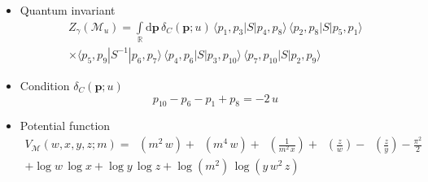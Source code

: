 \documentclass[12pt,reqno]{amsart}
\numberwithin{equation}{section}
\DeclareMathOperator{\Li}{Li_2}
\begin{document}
\begin{itemize}
\item Quantum invariant
  \begin{multline*}
    Z_\gamma \left( \mathcal{M}_u \right)
    = \int\limits_\mathbb{R} 
 \mathrm{d} \boldsymbol{p} \,
  \delta_C(\boldsymbol{p}; u) \,
    \langle p_1 , p_3 | S | p_4 , p_8 \rangle \,
    \langle p_2 , p_8 | S | p_5 , p_1 \rangle 
    \\
    \times
    \langle p_5 , p_9 | S^{-1} | p_6 , p_7 \rangle \,
    \langle p_4 , p_6 | S | p_3 , p_{10} \rangle \,
    \langle p_7 , p_{10} | S | p_2 , p_9 \rangle 
  \end{multline*}

\item
Condition $\delta_C(\boldsymbol{p};u)$
  \begin{equation*}
    p_{10} - p_6 - p_1 + p_8
    = -  2 \, u
  \end{equation*}

\item Potential function
  \begin{multline*}
    V_{\mathcal{M}}(w,x,y,z; m)
    =
    \Li \left(m^2 \, w\right) + \Li(m^4 \, w)
    + \Li\left(\frac{1}{m^2 \, x}\right)
    + \Li\left(\frac{z}{w}\right)
    - \Li\left(\frac{z}{y}\right) - \frac{\pi^2}{2}
    \\
    + \log w \, \log x + \log y \, \log z
    + \log \left( m^2 \right) \, \log (y \, w^2 \, z)
  \end{multline*}



\end{itemize}
\end{document}
